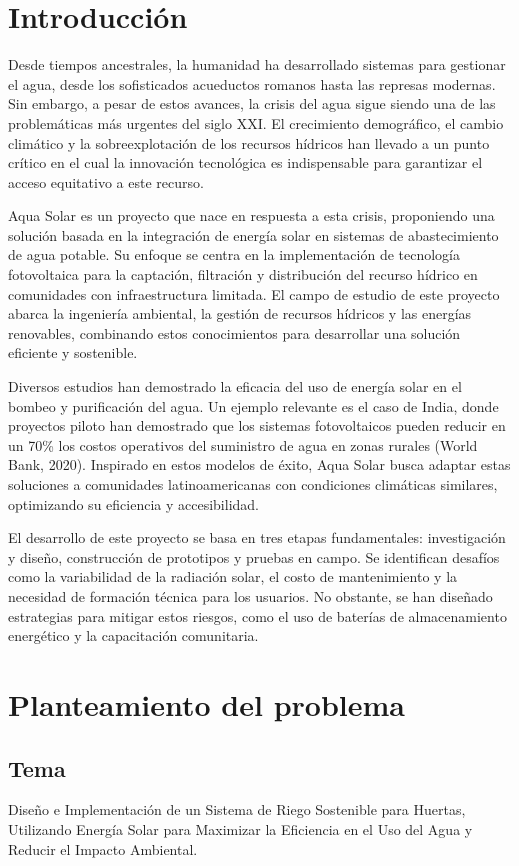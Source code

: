 \documentclass[12pt]{article}
\begin{document}
\newpage
\section{Introducción}
Desde tiempos ancestrales, la humanidad ha desarrollado sistemas para gestionar el agua, desde los sofisticados acueductos romanos hasta las represas modernas. Sin embargo, a pesar de estos avances, la crisis del agua sigue siendo una de las problemáticas más urgentes del siglo XXI. El crecimiento demográfico, el cambio climático y la sobreexplotación de los recursos hídricos han llevado a un punto crítico en el cual la innovación tecnológica es indispensable para garantizar el acceso equitativo a este recurso.

Aqua Solar es un proyecto que nace en respuesta a esta crisis, proponiendo una solución basada en la integración de energía solar en sistemas de abastecimiento de agua potable. Su enfoque se centra en la implementación de tecnología fotovoltaica para la captación, filtración y distribución del recurso hídrico en comunidades con infraestructura limitada. El campo de estudio de este proyecto abarca la ingeniería ambiental, la gestión de recursos hídricos y las energías renovables, combinando estos conocimientos para desarrollar una solución eficiente y sostenible.

Diversos estudios han demostrado la eficacia del uso de energía solar en el bombeo y purificación del agua. Un ejemplo relevante es el caso de India, donde proyectos piloto han demostrado que los sistemas fotovoltaicos pueden reducir en un 70\% los costos operativos del suministro de agua en zonas rurales (World Bank, 2020). Inspirado en estos modelos de éxito, Aqua Solar busca adaptar estas soluciones a comunidades latinoamericanas con condiciones climáticas similares, optimizando su eficiencia y accesibilidad.

El desarrollo de este proyecto se basa en tres etapas fundamentales: investigación y diseño, construcción de prototipos y pruebas en campo. Se identifican desafíos como la variabilidad de la radiación solar, el costo de mantenimiento y la necesidad de formación técnica para los usuarios. No obstante, se han diseñado estrategias para mitigar estos riesgos, como el uso de baterías de almacenamiento energético y la capacitación comunitaria.
\newpage
\section{Planteamiento del problema}
\subsection{Tema}
Diseño e Implementación de un Sistema de Riego Sostenible para Huertas, Utilizando Energía Solar para Maximizar la Eficiencia en el Uso del Agua y Reducir el Impacto Ambiental.
\end{document}

